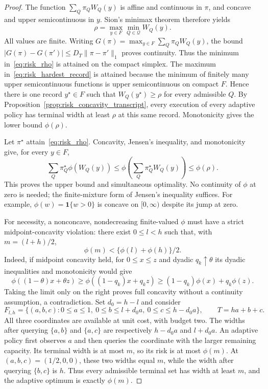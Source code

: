 \begin{proof}
The function $\sum_Q\pi_QW_Q(y)$ is affine and continuous in $\pi$,
and concave and upper semicontinuous in $y$. Sion's minimax theorem
therefore yields
\begin{equation}
 \rho=\max_{y\in F}\min_{Q\in\mathcal Q}W_Q(y).
 \label{eq:risk_hardest_record}
\end{equation}
All values are finite. Writing $G(\pi)=\max_{y\in F}\sum_Q\pi_QW_Q(y)$,
the bound $|G(\pi)-G(\pi')|\le D_T\|\pi-\pi'\|_1$ proves continuity.
Thus the minimum in~\eqref{eq:risk_rho} is attained on the compact simplex.
The maximum in~\eqref{eq:risk_hardest_record} is attained because the
minimum of finitely many upper semicontinuous functions is upper
semicontinuous on compact $F$. Hence there is one record $y^\star\in F$
such that $W_Q(y^\star)\ge\rho$ for every admissible $Q$.
By Proposition~\ref{prop:risk_concavity_transcript}, every execution of
every adaptive policy has terminal width at least $\rho$ at this same
record. Monotonicity gives the lower bound $\phi(\rho)$.

Let $\pi^\star$ attain~\eqref{eq:risk_rho}. Concavity, Jensen's
inequality, and monotonicity give, for every $y\in F$,
\[
 \sum_Q\pi^\star_Q\phi(W_Q(y))
 \le \phi\!\left(\sum_Q\pi^\star_QW_Q(y)\right)
 \le\phi(\rho).
\]
This proves the upper bound and simultaneous optimality. No continuity
of $\phi$ at zero is needed; the finite-mixture form of Jensen's
inequality suffices. For example, $\phi(w)=\boldsymbol{1}\{w>0\}$ is
concave on $[0,\infty)$ despite its jump at zero.

For necessity, a nonconcave, nondecreasing finite-valued $\phi$ must
have a strict midpoint-concavity violation: there exist $0\le l<h$ such
that, with $m=(l+h)/2$,
\begin{equation}
 \phi(m)<\{\phi(l)+\phi(h)\}/2.
 \label{eq:risk_midpoint_violation}
\end{equation}
Indeed, if midpoint concavity held, for $0\le x\le z$ and dyadic
$q_k\uparrow\theta$ its dyadic inequalities and monotonicity would give
\[
\phi((1-\theta)x+\theta z)
\ge\phi((1-q_k)x+q_kz)
\ge(1-q_k)\phi(x)+q_k\phi(z).
\]
Taking the limit only on the right proves full concavity without a
continuity assumption, a contradiction. Set $d_0=h-l$ and consider
\begin{equation}
 F_{l,h}=\{(a,b,c):0\le a\le1,\ 0\le b\le l+d_0a,
                  \ 0\le c\le h-d_0a\},\qquad T=ha+b+c.
 \label{eq:risk_converse_polytope}
\end{equation}
All three coordinates are available at unit cost, with budget two.
The widths after querying $\{a,b\}$ and $\{a,c\}$ are respectively
$h-d_0a$ and $l+d_0a$. An adaptive policy first observes $a$ and then
queries the coordinate with the larger remaining capacity. Its terminal
width is at most $m$, so its risk is at most $\phi(m)$.
At $(a,b,c)=(1/2,0,0)$, these two widths equal $m$, while the width
after querying $\{b,c\}$ is $h$. Thus every admissible terminal set
has width at least $m$, and the adaptive optimum is exactly $\phi(m)$.


\end{proof}
